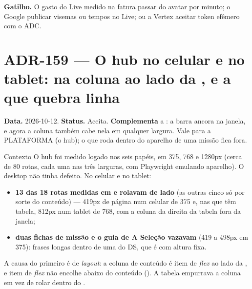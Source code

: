 \textbf{Gatilho.} O gasto do Live medido na fatura passar do avatar por
minuto; o Google publicar visemas ou tempos no Live; ou a Vertex aceitar token
efêmero com o ADC.

\section{ADR-159 --- O hub no celular e no tablet:  na coluna ao lado da , e a  que quebra linha}
\label{adr:hub-responsivo}

\textbf{Data.} 2026-10-12. \textbf{Status.} Aceita. \textbf{Complementa} a
: a barra ancora na janela, e agora a coluna também cabe nela em
qualquer largura. Vale para a PLATAFORMA (o hub); o que roda dentro do
aparelho de uma missão fica fora.

\begin{especificacao}{Contexto}
O hub foi medido logado nos seis papéis, em 375, 768 e 1280px (cerca de 80
rotas, cada uma nas três larguras, com Playwright emulando aparelho). O
desktop não tinha defeito. No celular e no tablet:
\begin{itemize}
  \item \textbf{13 das 18 rotas medidas em  e 
    rolavam de lado} (as outras cinco só por sorte do conteúdo) --- 419px de página num celular de 375 e, nas que têm tabela,
    812px num tablet de 768, com a coluna da direita da tabela fora da janela;
  \item \textbf{duas fichas de missão e o guia de A Seleção vazavam} (419 a
    498px em 375): frases longas dentro de uma  do DS, que é
     com altura fixa.
\end{itemize}
A causa do primeiro é de \emph{layout}: a coluna de conteúdo é item de
\emph{flex} ao lado da , e item de \emph{flex} não encolhe abaixo do
conteúdo (). A tabela empurrava a coluna em vez de rolar
dentro do .
\end{especificacao}

